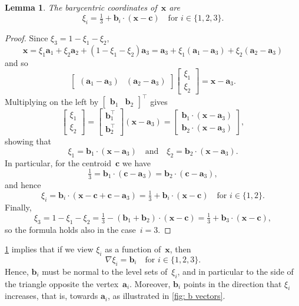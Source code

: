 \documentclass[a4paper,12pt]{article}
\newcommand{\bs}[1]{\boldsymbol{#1}}
\newtheorem{lemma}[theorem]{Lemma}
\begin{document}
\begin{lemma}\label{lem: xi_i}
The barycentric coordinates of~$\bs{x}$ are
\[
\xi_i=\tfrac13+\bs{b}_i\cdot(\bs{x}-\bs{c})\quad\text{for $i\in\{1,2,3\}$.}
\]
\end{lemma}
\begin{proof}
Since $\xi_3=1-\xi_1-\xi_2$,
\begin{equation}\label{eq: affine xi x}
\bs{x}=\xi_1\bs{a}_1+\xi_2\bs{a}_2+(1-\xi_1-\xi_2)\bs{a}_3
    =\bs{a}_3+\xi_1(\bs{a}_1-\bs{a}_3)+\xi_2(\bs{a}_2-\bs{a}_3)
\end{equation}
and so
\[
\begin{bmatrix}(\bs{a}_1-\bs{a}_3)&(\bs{a}_2-\bs{a}_3)\end{bmatrix}
\begin{bmatrix}\xi_1\\ \xi_2\end{bmatrix}=\bs{x}-\bs{a}_3.
\]
Multiplying on the left by $\begin{bmatrix}\bs{b}_1&\bs{b}_2\end{bmatrix}^\top$
gives
\[
\begin{bmatrix}\xi_1\\ \xi_2 \end{bmatrix}
    =\begin{bmatrix}\bs{b}_1^\top\\ \bs{b}_2^\top\end{bmatrix}(\bs{x}-\bs{a}_3)
    =\begin{bmatrix}\bs{b}_1\cdot(\bs{x}-\bs{a}_3)\\
                    \bs{b}_2\cdot(\bs{x}-\bs{a}_3)\end{bmatrix},
\]
showing that
\[
\xi_1=\bs{b}_1\cdot(\bs{x}-\bs{a}_3)\quad\text{and}\quad
\xi_2=\bs{b}_2\cdot(\bs{x}-\bs{a}_3).
\]
In particular, for the centroid~$\bs{c}$ we have
\[
\tfrac13=\bs{b}_1\cdot(\bs{c}-\bs{a}_3)=\bs{b}_2\cdot(\bs{c}-\bs{a}_3),
\]
and hence
\[
\xi_i=\bs{b}_i\cdot(\bs{x}-\bs{c}+\bs{c}-\bs{a}_3)
    =\tfrac13+\bs{b}_i\cdot(\bs{x}-\bs{c})\quad\text{for $i\in\{1,2\}$.}
\]
Finally,
\[
\xi_3=1-\xi_1-\xi_2=\tfrac13-(\bs{b}_1+\bs{b}_2)\cdot(\bs{x}-\bs{c})
    =\tfrac13+\bs{b}_3\cdot(\bs{x}-\bs{c}),
\]
so the formula holds also in the case~$i=3$.
\end{proof}

\cref{lem: xi_i} implies that if we view $\xi_i$ as a function of~$\bs{x}$, then
\begin{equation}\label{eq: grad xi_i}
\nabla\xi_i=\bs{b}_i\quad\text{for $i\in\{1,2,3\}$.}
\end{equation}
Hence, $\bs{b}_i$ must be normal to the level sets of~$\xi_i$, and in
particular to the side of the triangle opposite the vertex~$\bs{a}_i$.
Moreover, $\bs{b}_i$ points in the direction that $\xi_i$ increases, that is,
towards $\bs{a}_i$, as illustrated in \cref{fig: b vectors}.
\end{document}
